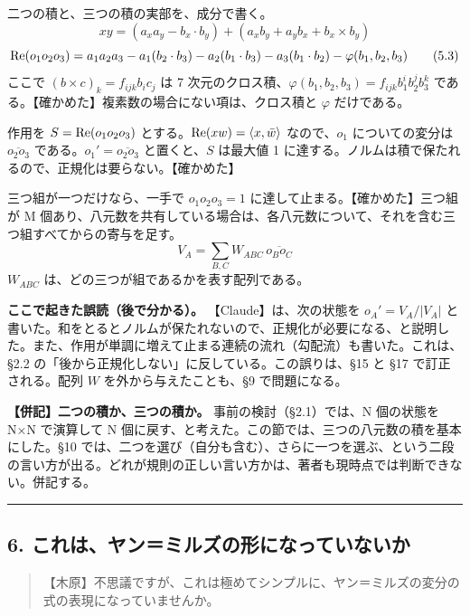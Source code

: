 \documentclass[
  a4paper,
]{ltjsarticle}
\begin{document}
二つの積と、三つの積の実部を、成分で書く。 \[
xy = (a_xa_y - b_x\cdot b_y) + (a_xb_y + a_yb_x + b_x\times b_y) \tag{5.2}
\] \[
{\rm Re}(o_1o_2o_3) = a_1a_2a_3 - a_1(b_2\cdot b_3) - a_2(b_1\cdot b_3) - a_3(b_1\cdot b_2) - \varphi(b_1, b_2, b_3) \tag{5.3}
\] ここで \((b\times c)_k = f_{ijk}b_ic_j\) は 7
次元のクロス積、\(\varphi(b_1,b_2,b_3) = f_{ijk}b_1^ib_2^jb_3^k\)
である。【確かめた】複素数の場合にない項は、クロス積と \(\varphi\)
だけである。

作用を \(S = {\rm Re}(o_1o_2o_3)\)
とする。\({\rm Re}(xw) = \langle x, \bar w\rangle\) なので、\(o_1\)
についての変分は \(\overline{o_2o_3}\)
である。\(o_1' = \overline{o_2o_3}\) と置くと、\(S\) は最大値 1
に達する。ノルムは積で保たれるので、正規化は要らない。【確かめた】

三つ組が一つだけなら、一手で \(o_1o_2o_3 = 1\)
に達して止まる。【確かめた】三つ組が M
個あり、八元数を共有している場合は、各八元数について、それを含む三つ組すべてからの寄与を足す。
\[
V_A = \sum_{B,C} W_{ABC}\,\overline{o_Bo_C} \tag{5.4}
\] \(W_{ABC}\) は、どの三つが組であるかを表す配列である。

\textbf{ここで起きた誤読（後で分かる）。} 【Claude】は、次の状態を
\(o_A' = V_A/\lvert V_A\rvert\)
と書いた。和をとるとノルムが保たれないので、正規化が必要になる、と説明した。また、作用が単調に増えて止まる連続の流れ（勾配流）も書いた。これは、§2.2
の「後から正規化しない」に反している。この誤りは、§15 と §17
で訂正される。配列 \(W\) を外から与えたことも、§9 で問題になる。

\textbf{【併記】二つの積か、三つの積か。} 事前の検討（§2.1）では、N
個の状態を N×N で演算して N
個に戻す、と考えた。この節では、三つの八元数の積を基本にした。§10
では、二つを選び（自分も含む）、さらに一つを選ぶ、という二段の言い方が出る。どれが規則の正しい言い方かは、著者も現時点では判断できない。併記する。

\begin{center}\rule{0.5\linewidth}{0.5pt}\end{center}

\subsection{6.
これは、ヤン＝ミルズの形になっていないか}\label{ux3053ux308cux306fux30e4ux30f3ux30dfux30ebux30baux306eux5f62ux306bux306aux3063ux3066ux3044ux306aux3044ux304b}

\begin{quote}
【木原】不思議ですが、これは極めてシンプルに、ヤン＝ミルズの変分の式の表現になっていませんか。
\end{quote}
\end{document}
